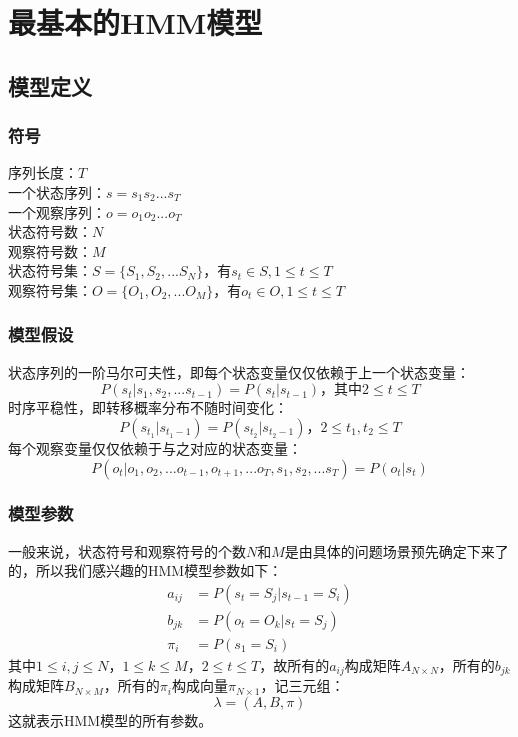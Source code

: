 \documentclass[11pt,a4paper]{article}
\numberwithin{equation}{section}
\begin{document}
 

\section{最基本的HMM模型}
\subsection{模型定义}
\subsubsection{符号}

\noindent
序列长度：$T$\\
一个状态序列：$s=s_1 s_2 ... s_T$\\
一个观察序列：$o=o_1 o_2 ... o_T$\\
状态符号数：$N$\\
观察符号数：$M$\\
状态符号集：$S=\{S_1, S_2, ... S_N\}$，有$s_t \in S, 1 \le t \le T$\\
观察符号集：$O=\{O_1, O_2, ... O_M\}$，有$o_t \in O, 1 \le t \le T$\\

\subsubsection{模型假设}

\noindent
状态序列的一阶马尔可夫性，即每个状态变量仅仅依赖于上一个状态变量：
\begin{equation} P(s_t | s_1, s_2, ... s_{t - 1}) = P(s_t | s_{t - 1})\text{，其中$2 \le t \le T$} \end{equation}
时序平稳性，即转移概率分布不随时间变化：
\begin{equation} P(s_{t_1} | s_{t_1 - 1}) = P(s_{t_2} | s_{t_2 - 1})\text{，$2 \le t_1, t_2 \le T$} \end{equation}
每个观察变量仅仅依赖于与之对应的状态变量：
\begin{equation} P(o_t | o_1, o_2, ... o_{t - 1}, o_{t + 1}, ... o_T, s_1, s_2, ... s_T) = P(o_t | s_t) \end{equation}

\subsubsection{模型参数}

一般来说，状态符号和观察符号的个数$N$和$M$是由具体的问题场景预先确定下来了的，所以我们感兴趣的HMM模型参数如下：
\begin{subequations}
\begin{align}
a_{ij} & = P(s_t = S_j | s_{t - 1} = S_i)\\
b_{jk} & = P(o_t = O_k | s_t = S_j)\\
\pi_i & = P(s_1 = S_i)
\end{align}
\end{subequations}
其中$1 \le i, j \le N$，$1 \le k \le M$，$2 \le t \le T$，故所有的$a_{ij}$构成矩阵$A_{N \times N}$，所有的$b_{jk}$构成矩阵$B_{N \times M}$，所有的$\pi_i$构成向量$\pi_{N \times 1}$，记三元组：
\begin{equation}
\lambda = (A, B, \pi)
\end{equation}
这就表示HMM模型的所有参数。
\end{document}

